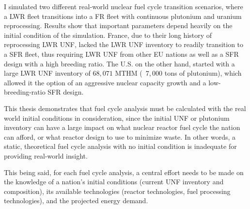 I simulated two different real-world nuclear fuel cycle transition scenarios,
where a \gls{LWR} fleet transitions into a \gls{FR} fleet with 
continuous plutonium and uranium reprocessing. Results show that important
parameters depend heavily on the initial condition of the simulation. France,
due to their long history of reprocessing \gls{LWR} \gls{UNF}, lacked the \gls{LWR}
\gls{UNF} inventory to readily transition to a \gls{SFR} fleet, thus requiring \gls{LWR}
\gls{UNF} from other \gls{EU} nations as well as a \gls{SFR} design with a high
breeding ratio. The U.S. on the other hand, started with a large \gls{LWR} \gls{UNF}
inventory of $68,071$ MTHM (~$7,000$ tons of plutonium), which allowed it the option of an aggressive nuclear capacity growth
and a low-breeding-ratio \gls{SFR} design.

This thesis demonstrates that fuel cycle analysis must be calculated with the real world initial conditions
in consideration, since the initial \gls{UNF} or plutonium inventory can have a large impact on what
nuclear reactor fuel cycle the nation can afford, or what reactor design to use to minimize
waste. In other words, a static, theoretical
fuel cycle analysis with no initial condition is inadequate for providing real-world insight.

This being said, for each fuel cycle analysis,
a central effort needs to be made on the knowledge of a nation's
initial conditions (current \gls{UNF} inventory and composition), its available
technologies (reactor technologies, fuel processing technologies), and the
projected energy demand.